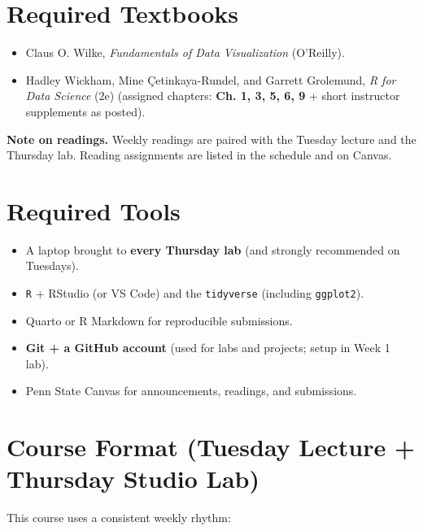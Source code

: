 \documentclass[letterpaper,11pt]{article}
\newcommand{\R}{\texttt{R}}
\newcommand{\FDV}{\emph{Fundamentals of Data Visualization}}
\newcommand{\RDS}{\emph{R for Data Science} (2e)}
\newcommand{\compresslist}{
\setlength{\itemsep}{1pt}
\setlength{\parskip}{0pt}
\setlength{\parsep}{0pt}
}
\begin{document}
\section*{Required Textbooks}
\begin{itemize}\compresslist
\item Claus O. Wilke, \FDV{} (O'Reilly).
\item Hadley Wickham, Mine \c{C}etinkaya-Rundel, and Garrett Grolemund, \RDS{} (assigned chapters: \textbf{Ch. 1, 3, 5, 6, 9} + short instructor supplements as posted).
\end{itemize}

\noindent \textbf{Note on readings.} Weekly readings are paired with the Tuesday lecture and the Thursday lab. Reading assignments are listed in the schedule and on Canvas.

\section*{Required Tools}
\begin{itemize}
\compresslist
\item A laptop brought to \textbf{every Thursday lab} (and strongly recommended on Tuesdays).
\item \R{} + RStudio (or VS Code) and the \texttt{tidyverse} (including \texttt{ggplot2}).
\item Quarto or R Markdown for reproducible submissions.
\item \textbf{Git + a GitHub account} (used for labs and projects; setup in Week 1 lab).
\item Penn State Canvas for announcements, readings, and submissions.
\end{itemize}

\section*{Course Format (Tuesday Lecture + Thursday Studio Lab)}
This course uses a consistent weekly rhythm:
\end{document}
